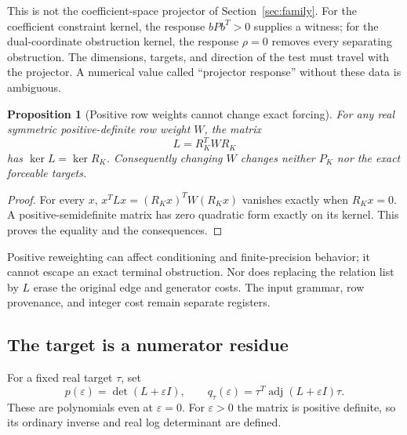 \documentclass[11pt,letterpaper]{article}
\newtheorem{proposition}[theorem]{Proposition}
\theoremstyle{definition}
\theoremstyle{remark}\newtheorem{remark}[theorem]{Remark}
\begin{document}
This is not the coefficient-space projector of Section~\ref{sec:family}. For the coefficient constraint kernel, the response $bPb^T>0$ supplies a witness; for the dual-coordinate obstruction kernel, the response $\rho=0$ removes every separating obstruction. The dimensions, targets, and direction of the test must travel with the projector. A numerical value called ``projector response'' without these data is ambiguous.

\begin{proposition}[Positive row weights cannot change exact forcing]\label{prop:weights}
For any real symmetric positive-definite row weight $W$, the matrix
\[
L=R_K^TWR_K
\]
has $\ker L=\ker R_K$. Consequently changing $W$ changes neither $P_K$ nor the exact forceable targets.
\end{proposition}
\begin{proof}
For every $x$, $x^TLx=(R_Kx)^TW(R_Kx)$ vanishes exactly when $R_Kx=0$. A positive-semidefinite matrix has zero quadratic form exactly on its kernel. This proves the equality and the consequences.
\end{proof}
Positive reweighting can affect conditioning and finite-precision behavior; it cannot escape an exact terminal obstruction. Nor does replacing the relation list by $L$ erase the original edge and generator costs. The input grammar, row provenance, and integer cost remain separate registers.

\subsection{The target is a numerator residue}
For a fixed real target $\tau$, set
\[
p(\varepsilon)=\det(L+\varepsilon I),\qquad
q_\tau(\varepsilon)=\tau^T\operatorname{adj}(L+\varepsilon I)\tau.
\]
These are polynomials even at $\varepsilon=0$. For $\varepsilon>0$ the matrix is positive definite, so its ordinary inverse and real log determinant are defined.
\end{document}
